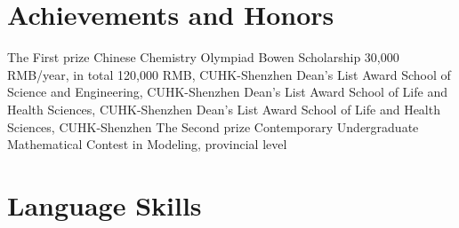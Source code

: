 \documentclass[12pt,a4paper,sans]{moderncv}
\newcommand{\cvsection}[1]{\section{{#1}}}
\begin{document}
\cvsection{Achievements and Honors}
{The First prize}{}
{Chinese Chemistry Olympiad}{}
{}
{Bowen Scholarship}{}
{30,000 RMB/year, in total 120,000 RMB, CUHK-Shenzhen}{}
{}
{Dean's List Award}{}
{School of Science and Engineering, CUHK-Shenzhen}{}
{}
{Dean's List Award}{}
{School of Life and Health Sciences, CUHK-Shenzhen}{}
{}
{Dean's List Award}{}
{School of Life and Health Sciences, CUHK-Shenzhen}{}
{}
{The Second prize}{}
{Contemporary Undergraduate Mathematical Contest in Modeling, provincial level}{}
{}




\cvsection{Language Skills}


\end{document}
